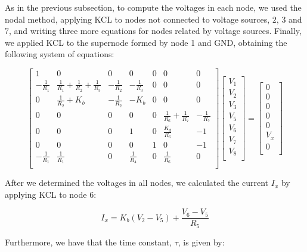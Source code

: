 As in the previous subsection, to compute the voltages in each node, we used the nodal method, applying KCL to nodes not connected to voltage sources, $2$, $3$ and $7$, and writing three more equations for nodes related by voltage sources. Finally, we applied KCL to the supernode formed by node 1 and GND, obtaining the following system of equations:

\[
{\begin{bmatrix}
1 & 0 & 0 & 0 & 0 & 0 & 0\\
-\frac{1}{R_1} & \frac{1}{R_1}+\frac{1}{R_2}+\frac{1}{R_3} & -\frac{1}{R_2} & -\frac{1}{R_3} & 0 & 0 & 0\\
0 & \frac{1}{R_2}+K_b & -\frac{1}{R_2} & -K_b & 0 & 0 & 0\\
0 & 0 & 0 & 0 & 0 & \frac{1}{R_6}+\frac{1}{R_7} & -\frac{1}{R_7}\\
0 & 0 & 0 & 1 & 0 & \frac{K_d}{R_6} & -1\\
0 & 0 & 0 & 0 & 1 & 0 & -1\\
-\frac{1}{R_1} & \frac{1}{R_1} & 0 & \frac{1}{R_4} & 0 & \frac{1}{R_6} & 0\\
            \end{bmatrix}
            }
{\begin{bmatrix}
V_1\\
V_2\\
V_3\\
V_5\\
V_6\\
V_7\\
V_8\\
            \end{bmatrix}
            }
    =
{\begin{bmatrix}
0\\
0\\
0\\
0\\
0\\
V_x\\
0\\
            \end{bmatrix}
            }
\]

After we determined the voltages in all nodes, we calculated the current $I_x$ by applying KCL to node 6:

\begin{equation}
  I_x = K_b(V_2-V_5)+\frac{V_6-V_5}{R_5}
\end{equation}

Furthermore, we have that the time constant, $\tau$, is given by:

